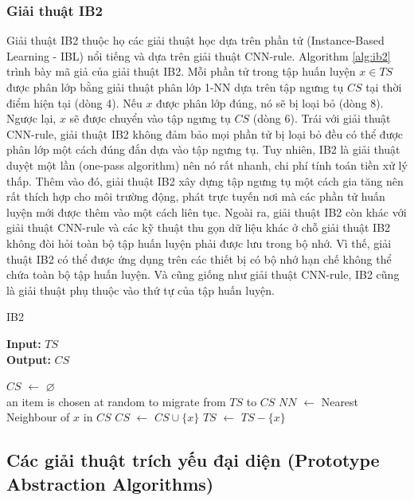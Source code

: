 \documentclass[13pt,oneside]{scrbook}
\newcommand*\Let[2]{\State #1 $\gets$ #2}
\let\emptyset\varnothing
\begin{document}
\subsubsection{Giải thuật IB2}
Giải thuật IB2 thuộc họ các giải thuật học dựa trên phần tử (Instance-Based Learning - IBL) nổi tiếng và dựa  trên giải thuật CNN-rule.
Algorithm \ref{alg:ib2} trình bày mã giả của giải thuật IB2.
Mỗi phần tử trong tập huấn luyện $x \in TS$ được phân lớp bằng giải thuật phân lớp 1-NN dựa trên tập ngưng tụ $CS$ tại thời điểm hiện tại (dòng 4).
Nếu $x$ được phân lớp đúng, nó sẽ bị loại bỏ (dòng 8).
Ngược lại, $x$ sẽ được chuyển vào tập ngưng tụ $CS$ (dòng 6).
Trái với giải thuật CNN-rule, giải thuật IB2 không đảm bảo mọi phần tử bị loại bỏ đều có thể được phân lớp một cách đúng đắn dựa vào tập ngưng tụ.
Tuy nhiên, IB2 là giải thuật duyệt một lần (one-pass algorithm) nên nó rất nhanh, chi phí tính toán tiền xử lý thấp.
Thêm vào đó, giải thuật IB2 xây dựng tập ngưng tụ một cách gia tăng nên rất thích hợp cho môi trường động, phát trực tuyến nơi mà các phần tử huấn luyện mới được thêm vào một cách liên tục.
Ngoài ra, giải thuật IB2 còn khác với giải thuật CNN-rule và các kỹ thuật thu gọn dữ liệu khác ở chỗ giải thuật IB2 không đòi hỏi toàn bộ tập huấn luyện phải được lưu trong bộ nhớ.
Vì thế, giải thuật IB2 có thể được ứng dụng trên các thiết bị có bộ nhớ hạn chế không thể chứa toàn bộ tập huấn luyện.
Và cũng giống như giải thuật CNN-rule, IB2 cũng là giải thuật phụ thuộc vào thứ tự của tập huấn luyện.

\begin{algorithm}[h!]
  \caption{IB2
   \label{alg:ib2}}
    \textbf{Input:} $TS$\\
    \textbf{Output:} $CS$
  \begin{algorithmic}[1]
      \Let{$CS$}{$\emptyset$}
      \\{an item is chosen at random to migrate from $TS$ to $CS$}
           \Let{$NN$}{Nearest Neighbour of $x$ in $CS$}
             \Let{$CS$}{$CS \cup \{x\}$}
            \EndIf
            \Let{$TS$}{$TS-\{x\}$}
          \EndFor
       \State {}
  \end{algorithmic}
\end{algorithm}
\subsection{Các giải thuật trích yếu đại diện (Prototype Abstraction Algorithms)}
\end{document}
